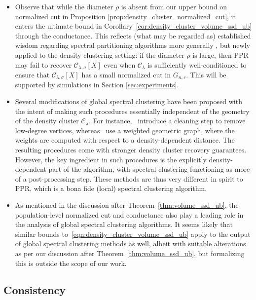 \documentclass[11pt,twoside]{article}
\newcommand{\1}{\mathbf{1}}
\newcommand{\mc}[1]{\mathcal{#1}}
\begin{document}
\begin{itemize}
	\item Observe that while the diameter $\rho$ is absent from our upper bound on normalized cut in Proposition \ref{prop:density_cluster_normalized_cut}, it enters the ultimate bound in Corollary~\ref{cor:density_cluster_volume_ssd_ub} through the conductance. This reflects
	(what may be regarded as) established wisdom regarding spectral partitioning
	algorithms more generally \citep{guattery1995, hein2010}, but newly applied
	to the density clustering setting: if the diameter $\rho$ is large, then PPR
	may fail to recover $\mc{C}_{\lambda,\sigma}[X]$ even when $\mc{C}_{\lambda}$ is sufficiently well-conditioned to ensure that $\mc{C}_{\lambda,\sigma}[X]$ has a small normalized cut in $G_{n,r}$. This will be supported by simulations in Section \ref{sec:experiments}.   
	\item Several modifications of global spectral clustering have been proposed with the intent of making such procedures essentially independent of the geometry of the density cluster $\mc{C}_{\lambda}$. For instance,~\citep{pelletier2011,arias-castro2009} introduce a cleaning step to remove low-degree vertices, whereas~\cite{little2020} use a weighted geometric graph, where the weights are computed with respect to a density-dependent distance. The resulting procedures come with stronger density cluster recovery guarantees. However, the key ingredient in such procedures is the explicitly density-dependent part of the algorithm, with spectral clustering functioning as more of a post-processing step. These methods are thus very different in spirit to PPR, which is a bona fide (local) spectral clustering algorithm. 
	\item As mentioned in the discussion after Theorem~\ref{thm:volume_ssd_ub}, the population-level normalized cut and conductance also play a leading role in the analysis of global spectral clustering algorithms. It seems likely that similar bounds to~\eqref{eqn:density_cluster_volume_ssd_ub} apply to the output of global spectral clustering methods as well, albeit with suitable alterations as per our discussion after Theorem~\ref{thm:volume_ssd_ub}, but formalizing this is outside the scope of our work.
\end{itemize}

\subsection{Consistency}
\label{subsec:consistent_recovery_density_clusters}
\end{document}
